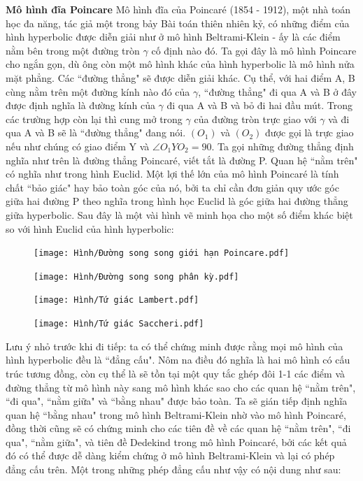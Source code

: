 \begin{multicols}{2}
	\textbf{\color{lichsutoanhoc}Mô hình đĩa Poincare}
	Mô hình đĩa của Poincaré (1854 - 1912), một nhà toán học đa năng, tác giả một trong bảy Bài toán thiên nhiên kỷ, có những điểm của hình hyperbolic được diễn giải như ở mô hình Beltrami-Klein - ấy là các điểm nằm bên trong một đường tròn $\gamma $ cố định nào đó. Ta gọi đây là mô hình Poincare cho ngắn gọn, dù ông còn một mô hình khác của hình hyperbolic là mô hình nửa mặt phẳng. 
	Các ``đường thẳng" sẽ được diễn giải khác. Cụ thể, với hai điểm A, B cùng nằm trên một đường kính nào đó của $\gamma$, ``đường thẳng" đi qua A và B ở đây được định nghĩa là đường kính của $\gamma$ đi qua A và B và bỏ đi hai đầu mút. Trong các trường hợp còn lại thì cung mở trong $\gamma$ của đường tròn trực giao với $\gamma$ và đi qua A và B sẽ là ``đường thẳng" đang nói. $(O_1)$ và $(O_2)$ được gọi là trực giao nếu như chúng có giao điểm Y và $ \angle O_1YO_2 = 90$. Ta gọi những đường thẳng định nghĩa như trên là đường thẳng Poincaré, viết tắt là đường P. 
	Quan hệ ``nằm trên" có nghĩa như trong hình Euclid. Một lợi thế lớn của mô hình Poincaré là tính chất ``bảo giác" hay bảo toàn góc của nó, bởi ta chỉ cần đơn giản quy ước góc giữa hai đường P theo nghĩa trong hình học Euclid là góc giữa hai đường thẳng giữa hyperbolic.
	Sau đây là một vài hình vẽ minh họa cho một số điểm khác biệt so với hình Euclid của hình hyperbolic:
	
	\begin{figure}[ht]
		\texttt{[image: Hình/Đường song song giới hạn Poincare.pdf]}
	\end{figure}
	
	\begin{figure}[ht]
		\texttt{[image: Hình/Đường song song phân kỳ.pdf]}
	\end{figure}
	
	\begin{figure}[ht]
		\texttt{[image: Hình/Tứ giác Lambert.pdf]}
	\end{figure}
	
	\begin{figure}[ht]
		\texttt{[image: Hình/Tứ giác Saccheri.pdf]}
	\end{figure}
	
	\newpage
	
	Lưu ý nhỏ trước khi đi tiếp: ta có thể chứng minh được rằng mọi mô hình của hình hyperbolic đều là ``đẳng cấu". Nôm na điều đó nghĩa là hai mô hình có cấu trúc tương đồng, còn cụ thể là sẽ tồn tại một quy tắc ghép đôi 1-1 các điểm và đường thẳng từ mô hình này sang mô hình khác sao cho các quan hệ ``nằm trên", ``đi qua", ``nằm giữa" và ``bằng nhau" được bảo toàn. Ta sẽ gián tiếp định nghĩa quan hệ ``bằng nhau" trong mô hình Beltrami-Klein nhờ vào mô hình Poincaré, đồng thời cũng sẽ có chứng minh cho các tiên đề về các quan hệ ``nằm trên", ``đi qua", ``nằm giữa", và tiên đề Dedekind trong mô hình Poincaré, bởi các kết quả đó có thể được dễ dàng kiểm chứng ở mô hình Beltrami-Klein và lại có phép đẳng cấu trên. Một trong những phép đẳng cấu như vậy có nội dung như sau:
	

\end{multicols}

